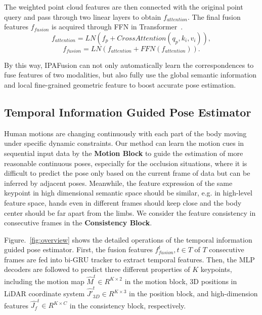 \documentclass[letterpaper]{article} %
\begin{document}
The weighted point cloud features are then connected with the original point query and pass through two linear layers to obtain $f_{attention}$. The final fusion features $f_{fusion}$ is acquired through FFN in Transformer~\cite{vaswani2017attention}.
$$f_{attention} =  LN(f_p + CrossAttention(q_p,k_i,v_i)), $$
$$f_{fusion} = LN(f_{attention} + FFN(f_{attention})).$$

By this way, IPAFusion can not only automatically learn the correspondences to fuse features of two modalities, but also fully use the global semantic information and local fine-grained geometric feature to boost accurate pose estimation.



\subsection{Temporal Information Guided Pose Estimator}
Human motions are changing continuously with each part of the body moving under specific dynamic constraints. Our method can learn the motion cues in sequential input data by the \textbf{Motion Block} to guide the estimation of more reasonable continuous poses, especially for the occlusion situations, where it is difficult to predict the pose only based on the current frame of data but can be inferred by adjacent poses. Meanwhile, the feature expression of the same keypoint in high dimensional semantic space should be similar, e.g. in high-level feature space, hands even in different frames should keep close and the body center should be far apart from the limbs. We consider the feature consistency in consecutive frames in the \textbf{Consistency Block}.


Figure.~\ref{fig:overview} shows the detailed operations of the temporal information guided pose estimator. First, the fusion features $f^t_{fusion},t\in T$ of $T$ consecutive frames are fed into bi-GRU tracker to extract temporal features. Then, the MLP decoders are followed to predict three different properties of $K$ keypoints, including the motion map $\hat{M}^t \in R^{K \times 2} $ in the motion block, 3D positions in LiDAR coordinate system $\hat{J'}_{3D}^t \in R^{K \times 3}$ in the position block, and high-dimension features $\hat{J_f}^t \in R^{K \times C}$ in the consistency block, respectively. 
\end{document}
